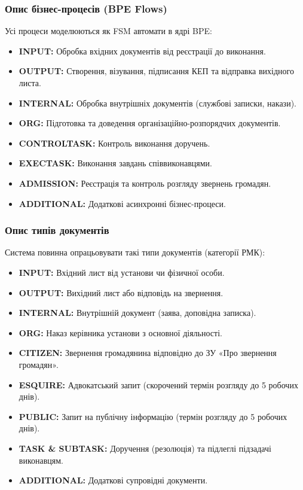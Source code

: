 \documentclass{article}
\begin{document}
\subsubsection{Опис бізнес-процесів (BPE Flows)}
Усі процеси моделюються як FSM автомати в ядрі BPE:
\begin{itemize}
    \item \textbf{INPUT:} Обробка вхідних документів від реєстрації до виконання.
    \item \textbf{OUTPUT:} Створення, візування, підписання КЕП та відправка вихідного листа.
    \item \textbf{INTERNAL:} Обробка внутрішніх документів (службові записки, накази).
    \item \textbf{ORG:} Підготовка та доведення організаційно-розпорядчих документів.
    \item \textbf{CONTROLTASK:} Контроль виконання доручень.
    \item \textbf{EXECTASK:} Виконання завдань співвиконавцями.
    \item \textbf{ADMISSION:} Реєстрація та контроль розгляду звернень громадян.
    \item \textbf{ADDITIONAL:} Додаткові асинхронні бізнес-процеси.
\end{itemize}

\subsubsection{Опис типів документів}
Система повинна опрацьовувати такі типи документів (категорії РМК):
\begin{itemize}
    \item \textbf{INPUT:} Вхідний лист від установи чи фізичної особи.
    \item \textbf{OUTPUT:} Вихідний лист або відповідь на звернення.
    \item \textbf{INTERNAL:} Внутрішній документ (заява, доповідна записка).
    \item \textbf{ORG:} Наказ керівника установи з основної діяльності.
    \item \textbf{CITIZEN:} Звернення громадянина відповідно до ЗУ «Про звернення громадян».
    \item \textbf{ESQUIRE:} Адвокатський запит (скорочений термін розгляду до 5 робочих днів).
    \item \textbf{PUBLIC:} Запит на публічну інформацію (термін розгляду до 5 робочих днів).
    \item \textbf{TASK \& SUBTASK:} Доручення (резолюція) та підлеглі підзадачі виконавцям.
    \item \textbf{ADDITIONAL:} Додаткові супровідні документи.
\end{itemize}
\end{document}
